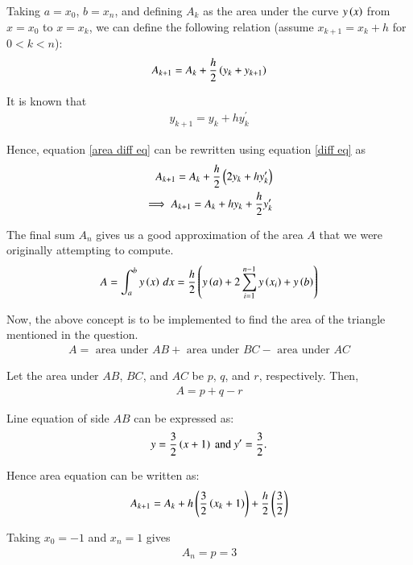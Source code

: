 \documentclass[journal]{IEEEtran}
\begin{document}
Taking $a = x_0$, $b = x_n$, and defining $A_k$ as the area under the curve $y\left(x\right)$ from $x = x_0$ to $x = x_k$, we can define the following relation (assume $x_{k+1} = x_k + h$ for $0<k<n$):
\begin{align}
A_{k+1} = A_k + \frac{h}{2}\left(y_{k} + y_{k+1}\right) \label{area diff eq}
\end{align}

It is known that
\begin{align}
y_{k+1} = y_k + hy^{\prime}_k \label{diff eq}
\end{align}

Hence, equation \eqref{area diff eq} can be rewritten using equation \eqref{diff eq} as
\begin{align}
A_{k+1} = A_k + \frac{h}{2}\left(2y_{k} + hy^{\prime}_k\right) \\
\implies A_{k+1} = A_k + hy_k + \frac{h}{2}y^{\prime}_k
\end{align}

The final sum $A_n$ gives us a good approximation of the area $A$ that we were originally attempting to compute.
\begin{align}
A = \int_{a}^{b} y\left(x\right) \,dx = \frac{h}{2}\left(y\left(a\right) + 2\sum_{i=1}^{n-1}y\left(x_i\right) + y\left(b\right)\right)
\end{align}

Now, the above concept is to be implemented to find the area of the triangle mentioned in the question.
\begin{align}
A = \text{ area under } AB + \text{ area under } BC - \text{ area under } AC
\end{align}

Let the area under $AB$, $BC$, and $AC$ be $p$, $q$, and $r$, respectively. Then,
\begin{align}
A = p + q - r \label{A eq}
\end{align}

Line equation of side $AB$ can be expressed as:
\begin{align}
y = \frac{3}{2}\left(x+1\right) \text{ and } y^{\prime} = \frac{3}{2}.
\end{align}

Hence area equation can be written as:
\begin{align}
A_{k+1} = A_k + h\left(\frac{3}{2}\left(x_k+1\right)\right) + \frac{h}{2}\left(\frac{3}{2}\right)
\end{align}

Taking $x_0 = -1$ and $x_n = 1$ gives
\begin{align}
A_n = p = 3 \label{p}
\end{align}
\end{document}
